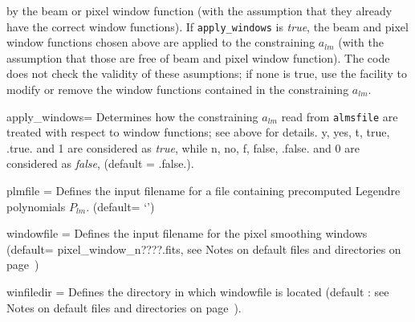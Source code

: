 \begin{qualifiers}
\begin{qulistwide}{}
by the beam or pixel window function (with the assumption that they already have the
    correct window functions). If {\tt apply\_windows} is {\em true}, the beam and
    pixel window functions chosen above are applied to the constraining $a_{lm}$ (with the
    assumption that those are free of beam and pixel window function). The code
    does not check the validity of these asumptions; if none is true, use the
     facility to modify or remove
    the window functions contained in the constraining $a_{lm}$.
%
     \item[{apply\_windows=}] Determines how the constraining $a_{lm}$  read from
     {\tt almsfile} are
     treated with respect to window functions; see above for details. 
     y, yes, t, true, .true. and 1 are considered as {\em true}, while n, no, f,
     false, .false. and 0 are considered as {\em false}, (default = .false.).
%
     \item[{plmfile = }] Defines the input  filename for a file
    containing  precomputed Legendre polynomials $P_{lm}$.
(default= `')
     \item[{windowfile = }] Defines the input filename  for the pixel
    smoothing windows 
(default= pixel\_window\_n????.fits, see Notes on default files and directories on page~\pageref{page:defdir})
     \item[{winfiledir = }] Defines the directory in which windowfile
    is located (default : see Notes on default files and directories on page~\pageref{page:defdir}).
  \end{qulistwide}
\end{qualifiers}

